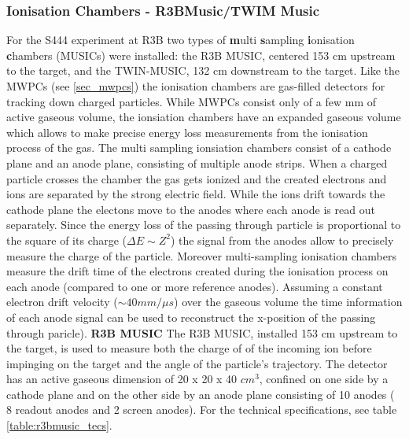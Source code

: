 \subsubsection{Ionisation Chambers - R3BMusic/TWIM Music}
For the S444 experiment at R3B two types of \textbf{m}ulti \textbf{s}ampling \textbf{i}onisation \textbf{c}hambers (MUSICs) were installed: the R3B MUSIC, centered 153 cm upstream to the target, and the TWIN-MUSIC, 132 cm downstream to the target. Like the MWPCs (see \ref{sec_mwpcs}) the ionisation chambers are gas-filled detectors for tracking down charged particles. While MWPCs consist only of a few mm of active gaseous volume, the ionsiation chambers have an expanded gaseous volume which allows to make precise energy loss measurements from the ionisation process of the gas. The multi sampling ionsiation chambers consist of a cathode plane and an anode plane, consisting of multiple anode strips. When a charged particle crosses the chamber the gas gets ionized and the created electrons and ions are separated by the strong electric field. While the ions drift towards the cathode plane the electons move to the anodes where each anode is read out separately. Since the energy loss of the passing through particle is proportional to the square of its charge ($\Delta E \sim Z^2$) the signal from the anodes allow to precisely measure the charge of the particle. Moreover multi-sampling ionisation chambers measure the drift time of the electrons created during the ionisation process  on each anode (compared to one or more reference anodes). Assuming a constant electron drift velocity ($\sim 40 mm/\mu s$) over the gaseous volume the time information of each anode signal can be used to reconstruct the x-position of the passing through paricle).\newline
\textbf{R3B MUSIC}\newline
The R3B MUSIC, installed 153 cm upstream to the target, is used to measure both the  charge of of the incoming ion before impinging on the target and the angle of the particle's trajectory. The detector has an active gaseous dimension of 20 x 20 x 40 $cm^3$, confined on one side by a cathode plane and on the other side by an anode plane consisting of 10 anodes ( 8 readout anodes and 2 screen anodes). For the technical specifications, see table \ref{table:r3bmusic_tecs}. \newline
